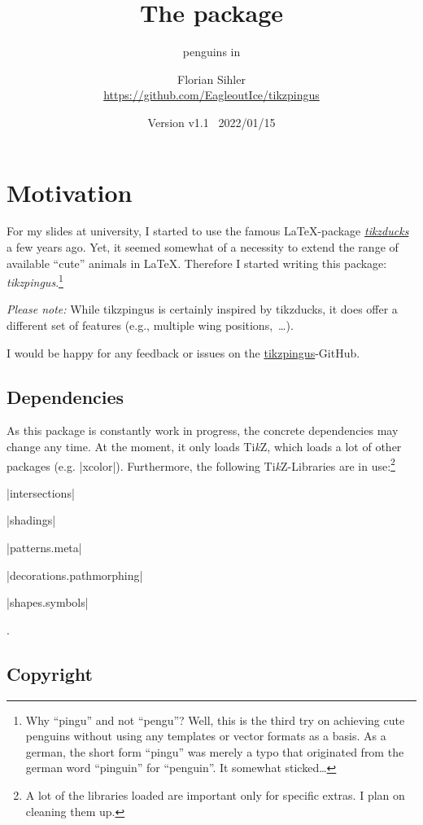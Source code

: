 \documentclass[parskip=half,english,numbers=noenddot,footnotes=nomultiple,oneside]{scrartcl}
\title{The \texorpdfstring{\tikzpingus}{tikzpingus} package}
\subtitle{penguins in \TikZ}
\author{%
	\texorpdfstring{Florian Sihler\\[.4em]
		\url{https://github.com/EagleoutIce/tikzpingus}
	}{Florian Sihler}}
\date{Version v1.1 \textendash\ 2022/01/15}
\let\say\enquote
\def\TikZ{Ti\textit{k}Z}
\begin{document}
\maketitle
\section{Motivation}

For my slides at university, I started to use the famous \LaTeX-package \textsl{\href{https://github.com/samcarter/tikzducks}{tikzducks}} a few years ago.
Yet, it seemed somewhat of a necessity to extend the range of available \say{cute} animals in \LaTeX.
Therefore I started writing this package: \textsl{tikzpingus}.\footnote{Why \say{pingu} and not \say{pengu}? Well, this is the third try on achieving cute penguins without using any templates or vector formats as a basis. As a german, the short form \say{pingu} was merely a typo that originated from the german word \say{pinguin} for \say{penguin}. It somewhat sticked\ldots}

\textit{Please note:} While tikzpingus is certainly inspired by tikzducks, it does offer a different set of features (e.g., multiple wing positions,~\ldots).

I would be happy for any feedback or issues on the \href{https://github.com/EagleoutIce/tikzpingus}{tikzpingus}-GitHub.

\subsection{Dependencies}

As this package is constantly work in progress, the concrete dependencies may change any time.
At the moment, it only loads \TikZ, which loads a lot of other packages (e.g. |xcolor|).
Furthermore, the following \TikZ-Libraries are in use:\footnote{A lot of the libraries loaded are important only for specific extras. I plan on cleaning them up.}
\begin{inlist}
	\item |intersections|
	\item |shadings|
	\item |patterns.meta|
	\item |decorations.pathmorphing|
	\item |shapes.symbols|
\end{inlist}.

\subsection{Copyright}
\end{document}
